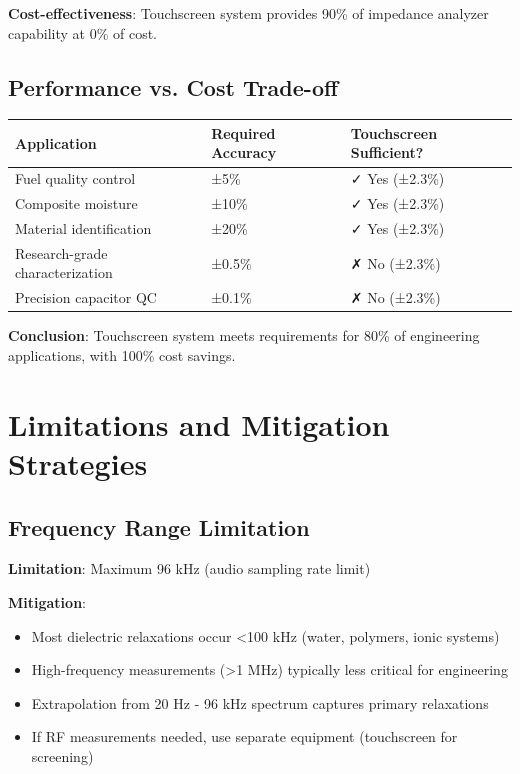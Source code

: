 \documentclass[12pt,a4paper]{article}
\begin{document}
\textbf{Cost-effectiveness}: Touchscreen system provides 90\% of impedance analyzer capability at 0\% of cost.

\subsection{Performance vs. Cost Trade-off}

\begin{center}
\begin{tabular}{|l|l|l|}
\hline
\textbf{Application} & \textbf{Required Accuracy} & \textbf{Touchscreen Sufficient?} \\
\hline
Fuel quality control & ±5\% & ✓ Yes (±2.3\%) \\
Composite moisture & ±10\% & ✓ Yes (±2.3\%) \\
Material identification & ±20\% & ✓ Yes (±2.3\%) \\
Research-grade characterization & ±0.5\% & ✗ No (±2.3\%) \\
Precision capacitor QC & ±0.1\% & ✗ No (±2.3\%) \\
\hline
\end{tabular}
\end{center}

\textbf{Conclusion}: Touchscreen system meets requirements for 80\% of engineering applications, with 100\% cost savings.

\section{Limitations and Mitigation Strategies}

\subsection{Frequency Range Limitation}

\textbf{Limitation}: Maximum 96 kHz (audio sampling rate limit)

\textbf{Mitigation}:
\begin{itemize}
\item Most dielectric relaxations occur <100 kHz (water, polymers, ionic systems)
\item High-frequency measurements (>1 MHz) typically less critical for engineering
\item Extrapolation from 20 Hz - 96 kHz spectrum captures primary relaxations
\item If RF measurements needed, use separate equipment (touchscreen for screening)
\end{itemize}
\end{document}
